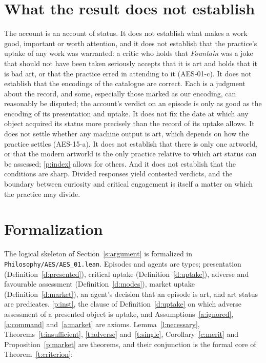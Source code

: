 \documentclass{situationist-preprint}
\begin{document}
\section{What the result does not establish}\label{s:notestablish}

The account is an account of status. It does not establish what makes a work good, important or worth attention, and it does not establish that the practice's uptake of any work was warranted: a critic who holds that \emph{Fountain} was a joke that should not have been taken seriously accepts that it is art and holds that it is bad art, or that the practice erred in attending to it (AES-01-c). It does not establish that the encodings of the catalogue are correct. Each is a judgment about the record, and some, especially those marked as our encoding, can reasonably be disputed; the account's verdict on an episode is only as good as the encoding of its presentation and uptake. It does not fix the date at which any object acquired its status more precisely than the record of its uptake allows. It does not settle whether any machine output is art, which depends on how the practice settles (AES-15-a). It does not establish that there is only one artworld, or that the modern artworld is the only practice relative to which art status can be assessed; \ref{p:index} allows for others. And it does not establish that the conditions are sharp. Divided responses yield contested verdicts, and the boundary between curiosity and critical engagement is itself a matter on which the practice may divide.

\section{Formalization}\label{s:formal}

The logical skeleton of Section~\ref{s:argument} is formalized in \nolinkurl{Philosophy/AES/AES_01.lean}. Episodes and agents are types; presentation (Definition~\ref{d:presented}), critical uptake (Definition~\ref{d:uptake}), adverse and favourable assessment (Definition~\ref{d:modes}), market uptake (Definition~\ref{d:market}), an agent's decision that an episode is art, and art status are predicates. \ref{p:inst}, the clause of Definition~\ref{d:uptake} on which adverse assessment of a presented object is uptake, and Assumptions~\ref{a:ignored}, \ref{a:command} and~\ref{a:market} are axioms. Lemma~\ref{l:necessary}, Theorems~\ref{t:insufficient}, \ref{t:adverse} and~\ref{t:single}, Corollary~\ref{c:merit} and Proposition~\ref{p:market} are theorems, and their conjunction is the formal core of Theorem~\ref{t:criterion}:
\end{document}

